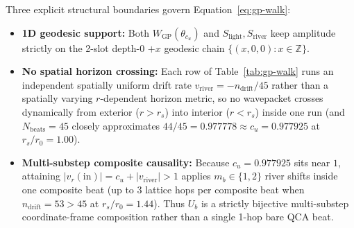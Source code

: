 Three explicit structural boundaries govern Equation~\eqref{eq:gp-walk}:
\begin{itemize}[itemsep=2pt]
\item \textbf{1D geodesic support:} Both $W_{\mathrm{GP}}(\theta_{c_u})$ and $S_{\mathrm{light}}, S_{\mathrm{river}}$
keep amplitude strictly on the 2-slot depth-0 $+x$ geodesic chain $\{(x, 0, 0) : x \in \mathbb{Z}\}$.
\item \textbf{No spatial horizon crossing:} Each row of Table~\ref{tab:gp-walk} runs an independent spatially uniform
drift rate $v_{\mathrm{river}} = -n_{\mathrm{drift}} / 45$ rather than a spatially varying $r$-dependent horizon
metric, so no wavepacket crosses dynamically from exterior ($r > r_s$) into interior ($r < r_s$) inside one run (and
$N_{\mathrm{beats}} = 45$ closely approximates $44/45 = 0.977778 \approx c_u = 0.977925$ at $r_s / r_0 = 1.00$).
\item \textbf{Multi-substep composite causality:} Because $c_u = 0.977925$ sits near $1$, attaining
$|v_r(\mathrm{in})| = c_u + |v_{\mathrm{river}}| > 1$ applies $m_b \in \{1, 2\}$ river shifts inside one composite beat
(up to 3 lattice hops per composite beat when $n_{\mathrm{drift}} = 53 > 45$ at $r_s / r_0 = 1.44$). Thus $U_b$ is a
strictly bijective multi-substep coordinate-frame composition rather than a single 1-hop bare QCA beat.
\end{itemize}

